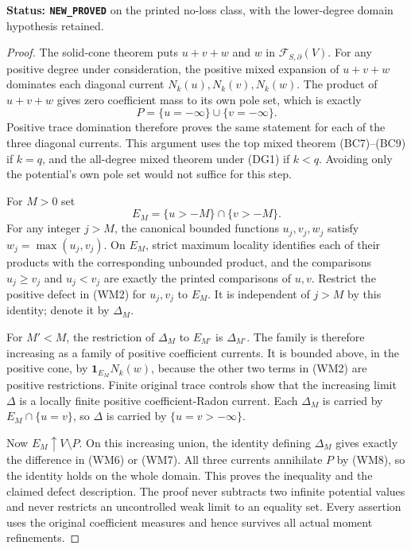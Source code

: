 \documentclass[11pt,a4paper]{article}
\numberwithin{equation}{section}
\theoremstyle{definition}
\theoremstyle{remark}
\begin{document}
\noindent\textbf{Status: \texttt{NEW\_PROVED}} on the
printed no-loss class, with the lower-degree domain hypothesis
retained.

\begin{proof}
The solid-cone theorem puts $u+v+w$ and $w$ in
$\mathcal F_{S,\partial}(V)$. For any positive degree under
consideration, the positive mixed expansion of $u+v+w$
dominates each diagonal current $N_k(u),N_k(v),N_k(w)$.
The product of $u+v+w$ gives zero coefficient mass to its
own pole set, which is exactly
\[
                       P=\{u=-\infty\}\cup\{v=-\infty\}.
 \tag{WM8}
\]
Positive trace domination therefore proves the same statement
for each of the three diagonal currents. This argument uses
the top mixed theorem (BC7)--(BC9) if $k=q$, and the all-degree
mixed theorem under (DG1) if $k<q$. Avoiding only the potential's
own pole set would not suffice for this step.

For $M>0$ set
\[
                E_M=\{u>-M\}\cap\{v>-M\}.
 \tag{WM9}
\]
For any integer $j>M$, the canonical bounded functions
$u_j,v_j,w_j$ satisfy $w_j=\max(u_j,v_j)$. On $E_M$,
strict maximum locality identifies each of their products
with the corresponding unbounded product, and the comparisons
$u_j\geq v_j$ and $u_j<v_j$ are exactly the printed
comparisons of $u,v$. Restrict the positive defect in (WM2)
for $u_j,v_j$ to $E_M$. It is independent of $j>M$ by this
identity; denote it by $\Delta_M$.

For $M'<M$, the restriction of $\Delta_M$ to $E_{M'}$
is $\Delta_{M'}$. The family is therefore increasing as a
family of positive coefficient currents. It is bounded above,
in the positive cone, by $\mathbf1_{E_M}N_k(w)$, because
the other two terms in (WM2) are positive restrictions.
Finite original trace controls show that the increasing limit
$\Delta$ is a locally finite positive coefficient-Radon current.
Each $\Delta_M$ is carried by
$E_M\cap\{u=v\}$, so $\Delta$ is carried by
$\{u=v> -\infty\}$.

Now $E_M\uparrow V\setminus P$. On this increasing union,
the identity defining $\Delta_M$ gives exactly the difference
in (WM6) or (WM7). All three currents annihilate $P$ by (WM8),
so the identity holds on the whole domain. This proves the
inequality and the claimed defect description. The proof never
subtracts two infinite potential values and never restricts an
uncontrolled weak limit to an equality set. Every assertion
uses the original coefficient measures and hence survives all
actual moment refinements.
\end{proof}
\end{document}
